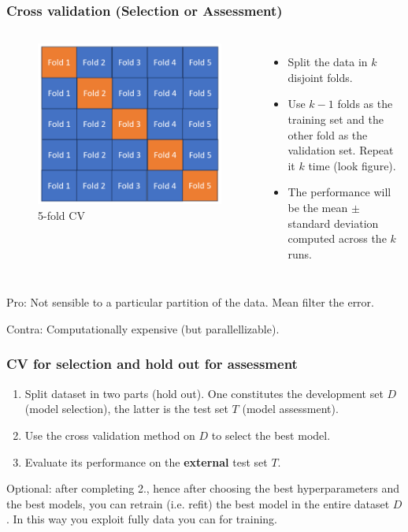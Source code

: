 \documentclass{beamer}
\begin{document}
	\begin{frame}
		\frametitle{Cross validation (Selection or Assessment)}
		\begin{columns}
			\begin{figure}
				\centering
				\includegraphics[scale=0.4]{images/cross-validation}
				\caption{5-fold CV}
			\end{figure}
			\begin{itemize}
				\item Split the data in $k$ disjoint folds.
				\item Use $k-1$ folds as the training set and the other fold as the validation set. Repeat it $k$ time (look figure).
				\item The performance will be the mean $\pm$ standard deviation computed across the $k$ runs.
			\end{itemize}
		\end{columns}
		Pro: Not sensible to a particular partition of the data. Mean filter the error.
		
		Contra: Computationally expensive (but parallellizable).
	\end{frame}

	\begin{frame}
		\frametitle{CV for selection and hold out for assessment}
		\begin{enumerate}
			\item Split dataset in two parts (hold out). One constitutes the development set $D$ (model selection), the latter is the test set $T$ (model assessment).
			\item Use the cross validation method on $D$ to select the best model.
			\item Evaluate its performance on the \textbf{external} test set $T$.
		\end{enumerate}
	
		Optional: after completing 2., hence after choosing the best hyperparameters and the best models, you can retrain (i.e. refit) the best model in the entire dataset $D$. In this way you exploit fully data you can for training.
	\end{frame}
\end{document}
